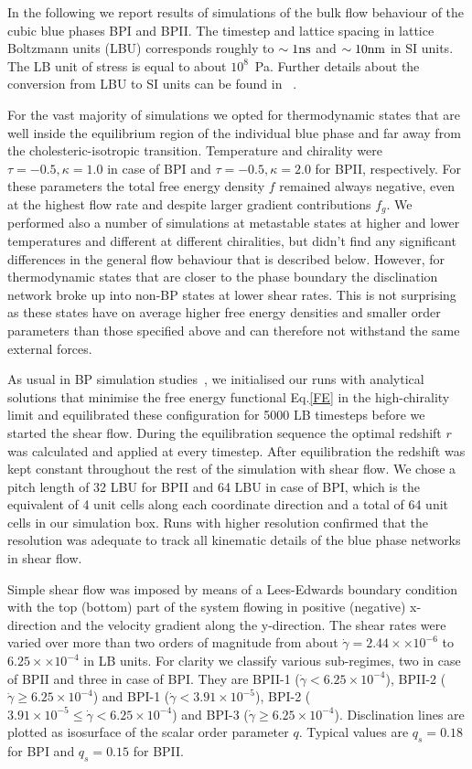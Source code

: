 \documentclass[aps,pre,reprint,superscriptaddress, twocolumn]{revtex4}
\newcommand{\e}[1]{\times10^{#1}}
\newcommand{\gd}{\dot{\gamma}}
\begin{document}
In the following we report results of simulations of the bulk flow behaviour of the cubic blue 
phases BPI and BPII. 
The timestep and lattice spacing in lattice Boltzmann units (LBU) corresponds roughly to
$\sim 1 {\rm ns}$ and $\sim 10{\rm nm}$ in SI units. The LB unit of stress
is equal to about $10^8$~Pa. Further details about the conversion 
from LBU to SI units can be found in ~\cite{Henrich:2011a,Henrich:2010b}.

For the vast majority of simulations we opted for thermodynamic states that are 
well inside the equilibrium region of the individual blue phase and far away 
from the cholesteric-isotropic transition. Temperature and chirality were 
$\tau=-0.5, \kappa=1.0$ in case of BPI and $\tau=-0.5, \kappa=2.0$ for BPII, respectively.
For these parameters the total free energy density $f$ remained always negative, 
even at the highest flow rate and despite larger gradient contributions $f_g$.
We performed also a number of simulations at metastable states at higher and lower temperatures 
and different at different chiralities, but didn't find any significant differences in the 
general flow behaviour that is described below.
However, for thermodynamic states that are closer to the phase boundary the disclination 
network broke up into non-BP states at lower shear rates. This is not surprising as
these states have on average higher free energy densities and smaller order parameters
than those specified above and can therefore not withstand the same external forces.

As usual in BP simulation studies~\cite{Henrich:2011a,Henrich:2010b}, we initialised our runs with 
analytical solutions that minimise the free energy functional Eq.\ref{FE} in the high-chirality limit 
and equilibrated these configuration for 5000 LB timesteps before we started the shear flow. 
During the equilibration sequence the optimal redshift $r$ was calculated and applied at every timestep.
After equilibration the redshift was kept constant throughout the rest of the simulation with shear flow.
We chose a pitch length of 32 LBU for BPII and 64 LBU in case of BPI, which is the equivalent 
of 4 unit cells along each coordinate direction and a total of 64 unit cells in our simulation box.
Runs with higher resolution confirmed that the resolution was adequate to track  
all kinematic details of the blue phase networks in shear flow.

Simple shear flow was imposed by means of a Lees-Edwards boundary condition ~\cite{Wagner:2002} with
the top (bottom) part of the system flowing in positive (negative) x-direction and the 
velocity gradient along the y-direction.
The shear rates were varied over more than two orders of magnitude from about 
$\gd=2.44\times \e{-6}$ to $6.25\times\e{-4}$ in LB units.
For clarity we classify various sub-regimes, two in case of BPII and three in case of BPI. 
They are BPII-1 ($\gd < 6.25\e{-4}$), BPII-2 ($\gd\ge 6.25\e{-4}$) and
BPI-1 ($\gd < 3.91\e{-5}$), BPI-2 ($3.91\e{-5}\le\gd< 6.25\e{-4}$) and BPI-3 ($\gd\ge 6.25\e{-4}$). 
Disclination lines are plotted as isosurface of the scalar order parameter $q$. Typical values 
are $q_s=0.18$ for BPI and $q_s=0.15$ for BPII.
\end{document}
